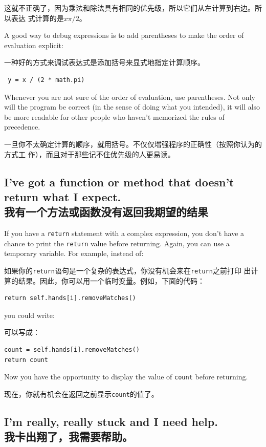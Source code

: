 \documentclass[10pt]{book}
\begin{document}
\begin{CJK}{UTF8}{gbsn}
这就不正确了，因为乘法和除法具有相同的优先级，所以它们从左计算到右边。所以表达
式计算的是$x \pi / 2$。

A good way to debug expressions is to add parentheses to make
the order of evaluation explicit:

一种好的方式来调试表达式是添加括号来显式地指定计算顺序。

\begin{verbatim}
 y = x / (2 * math.pi)
\end{verbatim}
%
Whenever you are not sure of the order of evaluation, use
parentheses.  Not only will the program be correct (in the sense
of doing what you intended), it will also be more readable for
other people who haven't memorized the rules of precedence.

一旦你不太确定计算的顺序，就用括号。不仅仅增强程序的正确性（按照你认为的方式工
作），而且对于那些记不住优先级的人更易读。


\subsection{I've got a function or method that doesn't return what I
expect.\\我有一个方法或函数没有返回我期望的结果}

If you have a {\tt return} statement with a complex expression,
you don't have a chance to print the {\tt return} value before
returning.  Again, you can use a temporary variable.  For
example, instead of:

如果你的{\tt return}语句是一个复杂的表达式，你没有机会来在{\tt return}之前打印
出计算的结果。因此，你可以用一个临时变量。例如，下面的代码：

\begin{verbatim}
return self.hands[i].removeMatches()
\end{verbatim}
%
you could write:

可以写成：

\begin{verbatim}
count = self.hands[i].removeMatches()
return count
\end{verbatim}
%
Now you have the opportunity to display the value of
{\tt count} before returning.

现在，你就有机会在返回之前显示{\tt count}的值了。


\subsection{I'm really, really stuck and I need help.\\我卡出翔了，我需要帮助。}


\end{CJK}
\end{document}
